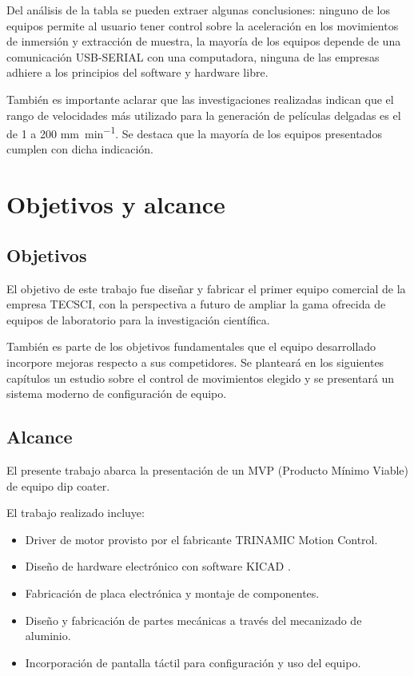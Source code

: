 Del análisis de la tabla se pueden extraer algunas conclusiones: ninguno de los equipos permite al usuario tener control sobre la aceleración en los movimientos de inmersión y extracción de muestra, la mayoría  de los equipos depende de una comunicación USB-SERIAL con una computadora, ninguna de las empresas adhiere a los principios del software y hardware libre.  

También es importante aclarar que las investigaciones realizadas indican que el rango de velocidades más utilizado para la generación de películas delgadas es el de 1 a 200 \si{\milli\meter\per\minute}. Se destaca que la mayoría de los equipos presentados cumplen con dicha indicación.


\section{Objetivos y alcance}

\subsection{Objetivos}

El objetivo de este trabajo fue diseñar y fabricar el primer equipo comercial de la empresa TECSCI, con la perspectiva a futuro de ampliar la gama ofrecida de equipos de laboratorio para la investigación científica.

También es parte de los objetivos fundamentales que el equipo desarrollado incorpore mejoras respecto a sus competidores. Se planteará en los siguientes capítulos un estudio sobre el control de movimientos elegido y se presentará un sistema moderno de configuración de equipo. 

\subsection{Alcance}

El presente trabajo abarca la presentación de un MVP (Producto Mínimo Viable) de equipo dip coater. 


El trabajo realizado incluye:

\begin{itemize}
\item Driver de motor provisto por el fabricante TRINAMIC Motion Control\citep{3_web_trinamic}.
\item Diseño de hardware electrónico con software KICAD \citep{web_kicad}.
\item Fabricación de placa electrónica y montaje de componentes.
\item Diseño y fabricación de partes mecánicas a través del mecanizado de aluminio.
\item Incorporación de pantalla táctil para configuración y uso del equipo.
\end{itemize}



